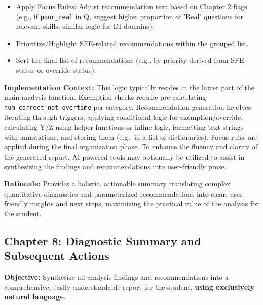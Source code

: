 \documentclass{article}
\begin{document}
\begin{enumerate}
\begin{itemize}
        \item Apply Focus Rules: Adjust recommendation text based on Chapter 2 flags (e.g., if \texttt{poor\_real} in Q, suggest higher proportion of 'Real' questions for relevant skills; similar logic for DI domains).
        \item Prioritize/Highlight SFE-related recommendations within the grouped list.
        \item Sort the final list of recommendations (e.g., by priority derived from SFE status or override status).
    \end{itemize}
\end{enumerate}

\textbf{Implementation Context:} This logic typically resides in the latter part of the main analysis function. Exemption checks require pre-calculating \texttt{num\_correct\_not\_overtime} per category. Recommendation generation involves iterating through triggers, applying conditional logic for exemption/override, calculating Y/Z using helper functions or inline logic, formatting text strings with annotations, and storing them (e.g., in a list of dictionaries). Focus rules are applied during the final organization phase. To enhance the fluency and clarity of the generated report, AI-powered tools may optionally be utilized to assist in synthesizing the findings and recommendations into user-friendly prose.

\textbf{Rationale:} Provides a holistic, actionable summary translating complex quantitative diagnostics and parameterized recommendations into clear, user-friendly insights and next steps, maximizing the practical value of the analysis for the student.

\subsection{Chapter 8: Diagnostic Summary and Subsequent Actions}

\textbf{Objective:} Synthesize all analysis findings and recommendations into a comprehensive, easily understandable report for the student, \textbf{using exclusively natural language}.
\end{document}
